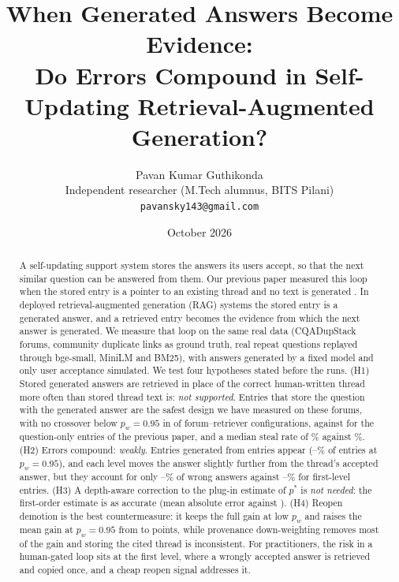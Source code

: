 \documentclass[11pt]{article}
\title{When Generated Answers Become Evidence:\\Do Errors Compound in Self-Updating Retrieval-Augmented Generation?}
\author{Pavan Kumar Guthikonda\\
\small Independent researcher (M.Tech alumnus, BITS Pilani)\\
\small \texttt{pavansky143@gmail.com}}
\date{October 2026}
\begin{document}
\maketitle

\begin{abstract}
A self-updating support system stores the answers its users accept, so that the next similar question can be answered from them. Our previous paper measured this loop when the stored entry is a pointer to an existing thread and no text is generated \citep{guthikonda2026accepted}. In deployed retrieval-augmented generation (RAG) systems the stored entry is a generated answer, and a retrieved entry becomes the evidence from which the next answer is generated. We measure that loop on the same real data (CQADupStack forums, community duplicate links as ground truth, real repeat questions replayed through bge-small, MiniLM and BM25), with answers generated by a fixed model and only user acceptance simulated. We test four hypotheses stated before the runs. (H1) Stored generated answers are retrieved in place of the correct human-written thread more often than stored thread text is: \emph{not supported}. Entries that store the question with the generated answer are the safest design we have measured on these forums, with no crossover below $p_w=0.95$ in \nSafeAskGen{} of \nConfigs{} forum--retriever configurations, against \nSafePOneAsk{} for the question-only entries of the previous paper, and a median steal rate of \stealMedAskGen{}\% against \stealMedPOneAsk{}\%. (H2) Errors compound: \emph{weakly}. Entries generated from entries appear (\deepShareLo{}--\deepShareHi{}\% of entries at $p_w=0.95$), and each level moves the answer slightly further from the thread's accepted answer, but they account for only \wrongDTwoLo{}--\wrongDTwoHi{}\% of wrong answers against \wrongDOneLo{}--\wrongDOneHi{}\% for first-level entries. (H3) A depth-aware correction to the plug-in estimate of $p^*$ is \emph{not needed}: the first-order estimate is as accurate (mean absolute error \maePlugOne{} against \maePlugTwo{}). (H4) Reopen demotion is the best countermeasure: it keeps the full gain at low $p_w$ and raises the mean gain at $p_w=0.95$ from \gainNaiveHigh{} to \gainReopenHigh{} points, while provenance down-weighting removes most of the gain and storing the cited thread is inconsistent. For practitioners, the risk in a human-gated loop sits at the first level, where a wrongly accepted answer is retrieved and copied once, and a cheap reopen signal addresses it.
\end{abstract}
\end{document}
